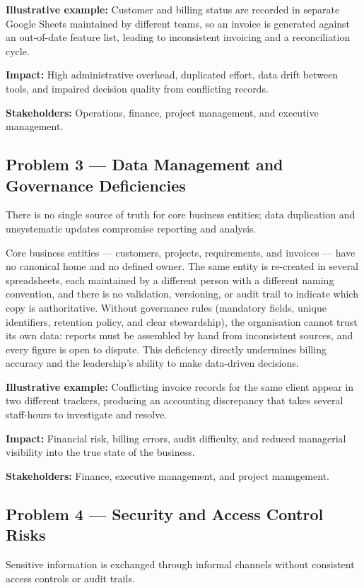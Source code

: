 \documentclass[12pt,a4paper]{report}
\begin{document}
\textbf{Illustrative example:} Customer and billing status are recorded in separate Google Sheets maintained by different teams, so an invoice is generated against an out-of-date feature list, leading to inconsistent invoicing and a reconciliation cycle.

\textbf{Impact:} High administrative overhead, duplicated effort, data drift between tools, and impaired decision quality from conflicting records.

\textbf{Stakeholders:} Operations, finance, project management, and executive management.

\subsection{Problem 3 --- Data Management and Governance Deficiencies}
\begin{problemBox}
There is no single source of truth for core business entities; data duplication and unsystematic updates compromise reporting and analysis.
\end{problemBox}

Core business entities --- customers, projects, requirements, and invoices --- have no canonical home and no defined owner. The same entity is re-created in several spreadsheets, each maintained by a different person with a different naming convention, and there is no validation, versioning, or audit trail to indicate which copy is authoritative. Without governance rules (mandatory fields, unique identifiers, retention policy, and clear stewardship), the organisation cannot trust its own data: reports must be assembled by hand from inconsistent sources, and every figure is open to dispute. This deficiency directly undermines billing accuracy and the leadership's ability to make data-driven decisions.

\textbf{Illustrative example:} Conflicting invoice records for the same client appear in two different trackers, producing an accounting discrepancy that takes several staff-hours to investigate and resolve.

\textbf{Impact:} Financial risk, billing errors, audit difficulty, and reduced managerial visibility into the true state of the business.

\textbf{Stakeholders:} Finance, executive management, and project management.

\subsection{Problem 4 --- Security and Access Control Risks}
\begin{problemBox}
Sensitive information is exchanged through informal channels without consistent access controls or audit trails.
\end{problemBox}
\end{document}
